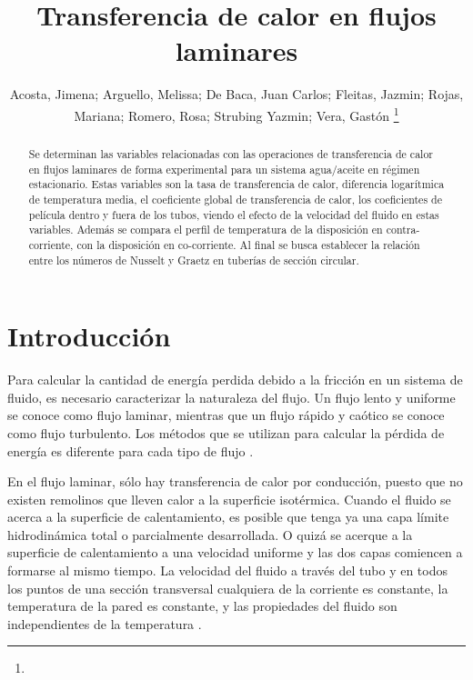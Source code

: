 \documentclass[journal, a4paper]{IEEEtran}
\begin{document}
	\title{Transferencia de calor en flujos laminares}
	\author{Acosta, Jimena; Arguello, Melissa; De Baca, Juan Carlos; Fleitas, Jazmin; Rojas, Mariana; Romero, Rosa; Strubing Yazmin; Vera, Gast\'on 
    \thanks{}}
	\maketitle

\begin{abstract}
Se determinan las variables relacionadas con las operaciones de transferencia de calor en flujos laminares de forma experimental para un sistema agua/aceite en r\'egimen estacionario. Estas variables son la tasa de transferencia de calor, diferencia logar\'itmica de temperatura media, el coeficiente global de transferencia de calor, los coeficientes de pel\'icula dentro y fuera de los tubos, viendo el efecto de la velocidad del fluido en estas variables. Adem\'as se compara el perfil de temperatura de la disposici\'on en contra-corriente, con la disposici\'on en co-corriente.  Al final se busca establecer la relaci\'on entre los n\'umeros de Nusselt y Graetz en tuber\'ias de secci\'on circular.
\end{abstract}

\section{Introducci\'on}
Para calcular la cantidad de energ\'ia perdida debido a la fricci\'on en un sistema de fluido, es necesario caracterizar la naturaleza del flujo. Un flujo lento y uniforme se conoce como flujo laminar, mientras que un flujo r\'apido y ca\'otico se conoce como flujo turbulento. Los m\'etodos que se utilizan para calcular la p\'erdida de energ\'ia es diferente para cada tipo de flujo \cite{Mott}.

En el flujo laminar, s\'olo hay transferencia de calor por conducci\'on, puesto que no existen remolinos que lleven calor a la superficie isot\'ermica. Cuando el fluido se acerca a la superficie de calentamiento, es posible que tenga ya una capa l\'imite hidrodin\'amica total o parcialmente desarrollada. O quiz\'a se acerque a la superficie de calentamiento a una velocidad uniforme y las dos capas comiencen a formarse al mismo tiempo. La velocidad del fluido a trav\'es del tubo
y en todos los puntos de una secci\'on transversal cualquiera de la corriente es constante, la temperatura de la pared es constante, y las propiedades del fluido son independientes de la temperatura \cite{McCabe}.
\end{document}
